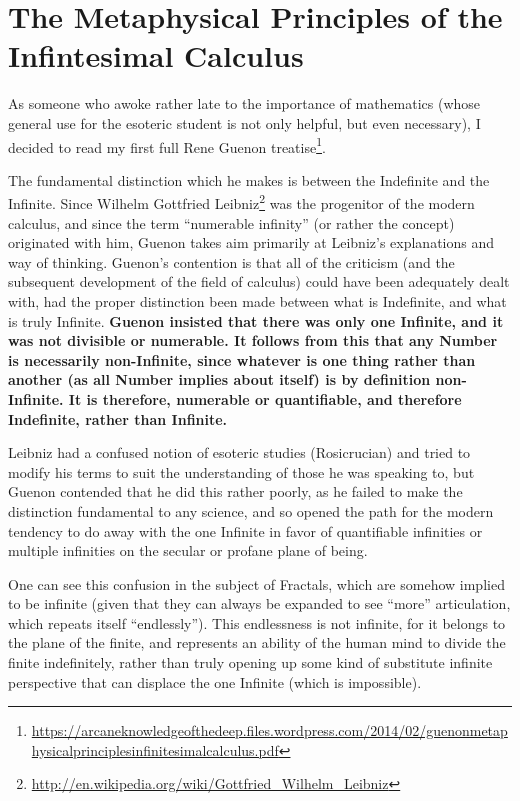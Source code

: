 \section{The Metaphysical Principles of the Infintesimal Calculus}

As someone who awoke rather late to the importance of mathematics (whose general use for the esoteric student is not only helpful, but even necessary), I decided to read my first full Rene Guenon treatise\footnote{\url{https://arcaneknowledgeofthedeep.files.wordpress.com/2014/02/guenonmetaphysicalprinciplesinfinitesimalcalculus.pdf}}.


The fundamental distinction which he makes is between the Indefinite and the Infinite. Since Wilhelm Gottfried Leibniz\footnote{\url{http://en.wikipedia.org/wiki/Gottfried\_Wilhelm\_Leibniz}} was the progenitor of the modern calculus, and since the term ``numerable infinity'' (or rather the concept) originated with him, Guenon takes aim primarily at Leibniz's explanations and way of thinking. Guenon's contention is that all of the criticism (and the subsequent development of the field of calculus) could have been adequately dealt with, had the proper distinction been made between what is Indefinite, and what is truly Infinite. \textbf{Guenon insisted that there was only one Infinite, and it was not divisible or numerable. It follows from this that any Number is necessarily non-Infinite, since whatever is one thing rather than another (as all Number implies about itself) is by definition non-Infinite. It is therefore, numerable or quantifiable, and therefore Indefinite, rather than Infinite.}

Leibniz had a confused notion of esoteric studies (Rosicrucian) and tried to modify his terms to suit the understanding of those he was speaking to, but Guenon contended that he did this rather poorly, as he failed to make the distinction fundamental to any science, and so opened the path for the modern tendency to do away with the one Infinite in favor of quantifiable infinities or multiple infinities on the secular or profane plane of being.

One can see this confusion in the subject of Fractals, which are somehow implied to be infinite (given that they can always be expanded to see ``more'' articulation, which repeats itself ``endlessly''). This endlessness is not infinite, for it belongs to the plane of the finite, and represents an ability of the human mind to divide the finite indefinitely, rather than truly opening up some kind of substitute infinite perspective that can displace the one Infinite (which is impossible).

